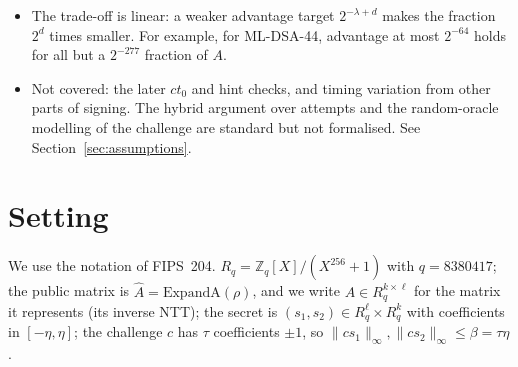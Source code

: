 \documentclass[11pt]{article}
\theoremstyle{definition}
\theoremstyle{remark}
\newcommand{\Zq}{\mathbb{Z}_q}
\newcommand{\Rq}{R_q}
\begin{document}
\begin{itemize}
        the true per-attempt deviation for a random $A$ thousands of bits below the proved bound
        (Section~\ref{sec:tight}).
  \item The trade-off is linear: a weaker advantage target $2^{-\lambda+d}$ makes the fraction $2^d$
        times smaller. For example, for ML-DSA-44, advantage at most $2^{-64}$ holds for all but a
        $2^{-277}$ fraction of $A$.
  \item Not covered: the later $ct_0$ and hint checks, and timing variation from other parts of
        signing. The hybrid
        argument over attempts and the random-oracle modelling of the challenge are standard but
        not formalised. See Section~\ref{sec:assumptions}.
\end{itemize}

\section{Setting}

We use the notation of FIPS~204. $\Rq = \Zq[X]/(X^{256}+1)$ with $q = 8380417$; the public
matrix is $\hat A = \mathrm{ExpandA}(\rho)$, and we write $A \in \Rq^{k\times\ell}$ for the matrix
it represents (its inverse NTT); the secret is $(s_1, s_2) \in \Rq^\ell\times\Rq^k$ with
coefficients in $[-\eta,\eta]$; the challenge $c$ has $\tau$ coefficients $\pm1$, so
$\|cs_1\|_\infty, \|cs_2\|_\infty \le \beta = \tau\eta$.
\end{document}
